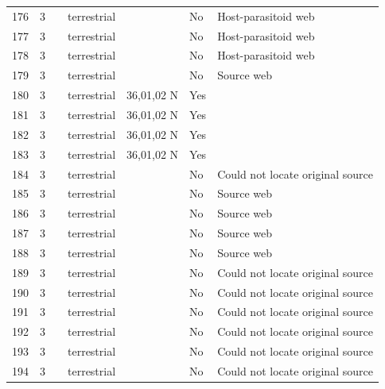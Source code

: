 \documentclass[12pt]{article}
\begin{document}
\begin{landscape}
\begin{table}[h!]
{\begin{tabular}{p{2.8cm}p{1.3cm}p{3cm}p{2.2cm}p{2.5cm}lp{8.2cm}}
        176   & 3 & \cite{Hawkins1984}    & terrestrial &       & No    & Host-parasitoid web \\
        177   & 3 & \cite{Hawkins1984}    & terrestrial &       & No    & Host-parasitoid web \\
        178   & 3 & \cite{Hawkins1984}    & terrestrial &       & No    & Host-parasitoid web \\
        179   & 3 & \cite{Robinson1953}  & terrestrial &       & No    & Source web \\
        180   & 3 & \cite{Savely1939}    & terrestrial & 36,01,02 N & Yes &     \\
        181   & 3 & \cite{Savely1939}    & terrestrial & 36,01,02 N & Yes &     \\
        182   & 3 & \cite{Savely1939}    & terrestrial & 36,01,02 N & Yes &     \\
        183   & 3 & \cite{Savely1939}    & terrestrial & 36,01,02 N & Yes &     \\
        184   & 3 & \cite{Beaver1972}     & terrestrial &       & No    & Could not locate original source \\
        185   & 3 & \cite{Chapman1955}     & terrestrial &       & No    & Source web \\
        186   & 3 & \cite{Cornaby1974}  & terrestrial &       & No    & Source web \\
        187   & 3 & \cite{Cornaby1974}  & terrestrial &       & No    & Source web \\
        188   & 3 & \cite{Jiron1981}  & terrestrial &       & No    & Source web \\
        189   & 3 & \cite{McKinnerney1978}    & terrestrial &       & No    & Could not locate original source \\
        190   & 3 & \cite{McKinnerney1978}    & terrestrial &       & No    & Could not locate original source \\
        191   & 3 & \cite{McKinnerney1978}    & terrestrial &       & No    & Could not locate original source \\
        192   & 3 & \cite{McKinnerney1978}    & terrestrial &       & No    & Could not locate original source \\
        193   & 3 & \cite{McKinnerney1978}    & terrestrial &       & No    & Could not locate original source \\
        194   & 3 & \cite{McKinnerney1978}    & terrestrial &       & No    & Could not locate original source \\
        \hline
        \end{tabular}}%
      \end{table}


\end{landscape}
\end{document}
